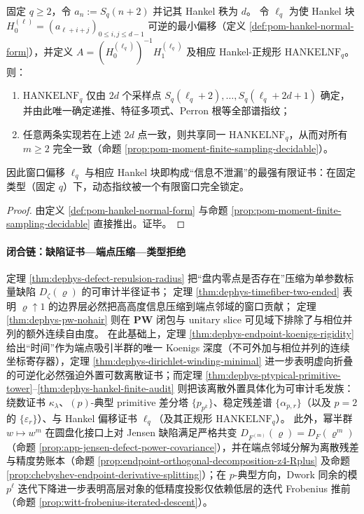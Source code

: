 \begin{theorem}\label{thm:dephys-hankel-finite-audit}
固定 \(q\ge 2\)，令 \(a_n:=S_q(n+2)\) 并记其 Hankel 秩为 \(d\)。
令 \(\ell_q\) 为使 Hankel 块 \(H_0^{(\ell)}=(a_{\ell+i+j})_{0\le i,j\le d-1}\) 可逆的最小偏移（定义 \ref{def:pom-hankel-normal-form}），并定义
\(
A=(H_0^{(\ell_q)})^{-1}H_1^{(\ell_q)}
\)
及相应 Hankel-正规形 \(\mathrm{HANKELNF}_q\)。
则：
\begin{enumerate}
  \item \(\mathrm{HANKELNF}_q\) 仅由 \(2d\) 个采样点 \(S_q(\ell_q+2),\dots,S_q(\ell_q+2d+1)\) 确定，并由此唯一确定递推、特征多项式、Perron 根等全部谱指纹；
  \item 任意两条实现若在上述 \(2d\) 点一致，则共享同一 \(\mathrm{HANKELNF}_q\)，从而对所有 \(m\ge 2\) 完全一致（命题 \ref{prop:pom-moment-finite-sampling-decidable}）。
\end{enumerate}
因此窗口偏移 \(\ell_q\) 与相应 Hankel 块即构成“信息不泄漏”的最强有限证书：在固定类型（固定 \(q\)）下，动态指纹被一个有限窗口完全锁定。
\end{theorem}

\begin{proof}
由定义 \ref{def:pom-hankel-normal-form} 与命题 \ref{prop:pom-moment-finite-sampling-decidable} 直接推出。证毕。
\end{proof}

\paragraph{闭合链：缺陷证书—端点压缩—类型拒绝}
定理 \ref{thm:dephys-defect-repulsion-radius} 把“盘内零点是否存在”压缩为单参数标量缺陷 \(D_{\zeta}(\varrho)\) 的可审计半径证书；
定理 \ref{thm:dephys-timefiber-two-ended} 表明 \(\varrho\uparrow 1\) 的边界层必然把高高度信息压缩到端点邻域的窗口贡献；
定理 \ref{thm:dephys-pw-nohair} 则在 \(\mathbf{PW}\) 闭包与 unitary slice 可见域下排除了与相位并列的额外连续自由度。
在此基础上，定理 \ref{thm:dephys-endpoint-koenigs-rigidity} 给出“时间”作为端点吸引半群的唯一 Koenigs 深度（不可外加与相位并列的连续坐标寄存器），定理 \ref{thm:dephys-dirichlet-winding-minimal} 进一步表明虚向折叠的可逆化必然强迫外置可数离散证书；而定理 \ref{thm:dephys-ptypical-primitive-tower}--\ref{thm:dephys-hankel-finite-audit} 则把该离散外置具体化为可审计毛发族：绕数证书 \(\kappa_{\lambda}\)、\((p)\)-典型 primitive 差分塔 \(\{p_{p^k}\}\)、稳定残差谱 \(\{\alpha_{p,r}\}\)（以及 \(p=2\) 的 \(\{\varepsilon_r\}\)）、与 Hankel 偏移证书 \(\ell_q\)（及其正规形 \(\mathrm{HANKELNF}_q\)）。
此外，幂半群 \(w\mapsto w^m\) 在圆盘化接口上对 Jensen 缺陷满足严格共变 \(D_{F^{(m)}}(\varrho)=D_F(\varrho^m)\)（命题 \ref{prop:app-jensen-defect-power-covariance}），并在端点邻域分解为离散残差与精度势账本（命题 \ref{prop:endpoint-orthogonal-decomposition-z4-Rplus} 及命题 \ref{prop:chebyshev-endpoint-derivative-splitting}）；在 \(p\)-典型方向，Dwork 同余的模 \(p^\ell\) 迭代下降进一步表明高层对象的低精度投影仅依赖低层的迭代 Frobenius 推前（命题 \ref{prop:witt-frobenius-iterated-descent}）。

